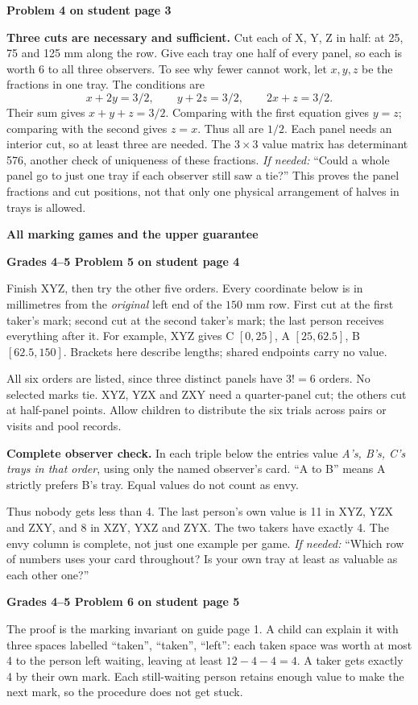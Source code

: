 \documentclass[11pt]{article}
\newcommand{\head}[1]{\par\textbf{\large #1}\par}
\newcommand{\sub}[1]{\par\textbf{#1}\par}
\newcommand{\hint}[1]{\textit{If needed:} #1}
\begin{document}
\sub{Problem 4 on student page 3}
\textbf{Three cuts are necessary and sufficient.} Cut each of X, Y, Z in half: at 25, 75 and 125 mm along the row. Give each tray one half of every panel, so each is worth 6 to all three observers. To see why fewer cannot work, let $x,y,z$ be the fractions in one tray. The conditions are
\[
x+2y=3/2,\qquad y+2z=3/2,\qquad 2x+z=3/2.
\]
Their sum gives $x+y+z=3/2$. Comparing with the first equation gives $y=z$; comparing with the second gives $z=x$. Thus all are $1/2$. Each panel needs an interior cut, so at least three are needed. The $3\times3$ value matrix has determinant 576, another check of uniqueness of these fractions. \hint{``Could a whole panel go to just one tray if each observer still saw a tie?''} This proves the panel fractions and cut positions, not that only one physical arrangement of halves in trays is allowed.
\newpage
\head{All marking games and the upper guarantee}
\sub{Grades 4--5 Problem 5 on student page 4}
Finish XYZ, then try the other five orders. Every coordinate below is in millimetres from the \emph{original} left end of the $150$ mm row. First cut at the first taker's mark; second cut at the second taker's mark; the last person receives everything after it. For example, XYZ gives C $[0,25]$, A $[25,62.5]$, B $[62.5,150]$. Brackets here describe lengths; shared endpoints carry no value.
\begin{center}\small\setlength{\tabcolsep}{4pt}\gametable\end{center}
All six orders are listed, since three distinct panels have $3!=6$ orders. No selected marks tie. XYZ, YZX and ZXY need a quarter-panel cut; the others cut at half-panel points. Allow children to distribute the six trials across pairs or visits and pool records.

\textbf{Complete observer check.} In each triple below the entries value \emph{A's, B's, C's trays in that order}, using only the named observer's card. ``A to B'' means A strictly prefers B's tray. Equal values do not count as envy.
\begin{center}\small\setlength{\tabcolsep}{5pt}\scoretable\end{center}
Thus nobody gets less than 4. The last person's own value is 11 in XYZ, YZX and ZXY, and 8 in XZY, YXZ and ZYX. The two takers have exactly 4. The envy column is complete, not just one example per game. \hint{``Which row of numbers uses your card throughout? Is your own tray at least as valuable as each other one?''}

\sub{Grades 4--5 Problem 6 on student page 5}
The proof is the marking invariant on guide page 1. A child can explain it with three spaces labelled ``taken'', ``taken'', ``left'': each taken space was worth at most 4 to the person left waiting, leaving at least $12-4-4=4$. A taker gets exactly 4 by their own mark. Each still-waiting person retains enough value to make the next mark, so the procedure does not get stuck.
\end{document}
